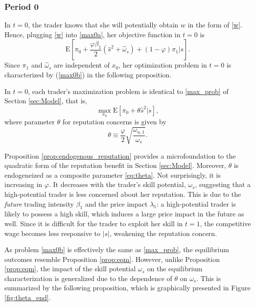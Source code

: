 \subsubsection{Period 0} \label{sss:period0}
In $t=0$, the trader knows that she will potentially obtain $w$ in the form of \eqref{w}. Hence, plugging \eqref{w} into \eqref{max0a}, her objective function in $t=0$ is
\begin{equation}
\mathrm{E}\left[\pi_{0}+\frac{\varphi\beta_{1}}{2}\left(\hat{s}^{2}+\hat{\omega}_{s}\right)+(1-\varphi)\pi_{1}\Big|s\right].\label{max0a2}
\end{equation}
Since $\pi_{1}$ and $\hat{\omega}_{s}$ are independent of $x_{0}$, her optimization problem in $t=0$ is characterized by (\ref{max0b}) in the following proposition.

\begin{proposition}\label{prop:endogenous_reputation}
In $t=0$, each trader's maximization problem is identical to \eqref{max_prob} of Section \ref{sec:Model}, that is,
\begin{equation}
\max_{x_{0}}\mathrm{E}\left[\pi_{0}+\theta\hat{s}^{2}\big|s\right], \label{max0b}
\end{equation}
where parameter $\theta$ for reputation concerns is given by
\begin{equation}
 \theta\equiv\frac{\varphi}{2}\sqrt{\frac{\omega_{u,1}}{\omega_{s}}}. \label{eq:theta}
\end{equation}
\end{proposition}

Proposition \ref{prop:endogenous_reputation} provides a microfoundation to the quadratic form of the reputation benefit in Section \ref{sec:Model}. Moreover, $\theta$ is endogeneized as a composite parameter \eqref{eq:theta}. Not surprisingly, it is increasing in $\varphi$. It decreases with the trader's skill potential, $\omega_{s}$, suggesting that a high-potential trader is less concerned about her reputation. This is due to the {\it future} trading intensity $\beta_{1}$ and the price impact $\lambda_{1}$: a high-potential trader is likely to possess a high skill, which induces a large price impact in the future as well. Since it is difficult for the trader to exploit her skill in $t=1$, the competitive wage becomes less responsive to $|s|$, weakening the reputation concern.

As problem \eqref{max0b} is effectively the same as \eqref{max_prob}, the equilibrium outcomes resemble Proposition \ref{prop:eqm}. However, unlike Proposition \ref{prop:eqm}, the impact of the skill potential $\omega_{s}$ on the equilibrium characterization is generalized due to the dependence of $\theta$ on $\omega_{s}$. This is summarized by the following proposition, which is graphically presented in Figure \ref{fig:theta_end}.


